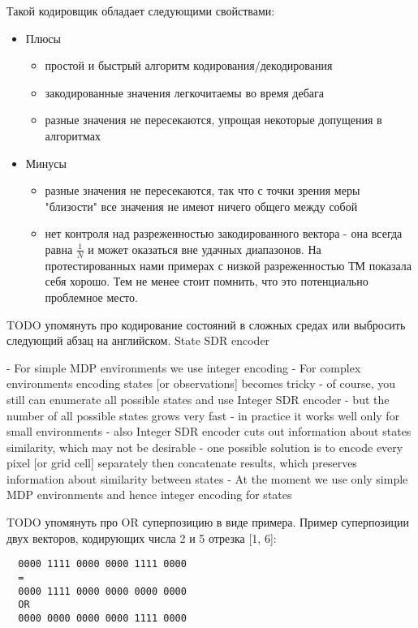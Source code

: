 \documentclass[a4paper]{article}
\begin{document}
Такой кодировщик обладает следующими свойствами:

\begin{itemize}
  \item Плюсы
  \begin{itemize}
    \item простой и быстрый алгоритм кодирования/декодирования
    \item закодированные значения легкочитаемы во время дебага
    \item разные значения не пересекаются, упрощая некоторые допущения в алгоритмах
  \end{itemize}

  \item Минусы
  \begin{itemize}
    \item разные значения не пересекаются, так что с точки зрения меры "близости" все значения не имеют ничего общего между собой
    \item нет контроля над разреженностью закодированного вектора - она всегда равна $\frac{1}{N}$ и может оказаться вне удачных диапазонов. На протестированных нами примерах с низкой разреженностью ТМ показала себя хорошо. Тем не менее стоит помнить, что это потенциально проблемное место.
  \end{itemize}
\end{itemize}

TODO упомянуть про кодирование состояний в сложных средах или выбросить следующий абзац на английском. State SDR encoder

- For simple MDP environments we use integer encoding
- For complex environments encoding states [or observations] becomes tricky
  - of course, you still can enumerate all possible states and use Integer SDR encoder
  - but the number of all possible states grows very fast
    - in practice it works well only for small environments
  - also Integer SDR encoder cuts out information about states similarity, which may not be desirable
  - one possible solution is to encode every pixel [or grid cell] separately then concatenate results, which preserves information about similarity between states
- At the moment we use only simple MDP environments and hence integer encoding for states

TODO упомянуть про OR суперпозицию в виде примера. Пример суперпозиции двух векторов, кодирующих числа 2 и 5 отрезка [1, 6]:

\begin{verbatim}
  0000 1111 0000 0000 1111 0000
  =
  0000 1111 0000 0000 0000 0000
  OR
  0000 0000 0000 0000 1111 0000
\end{verbatim}
\end{document}
